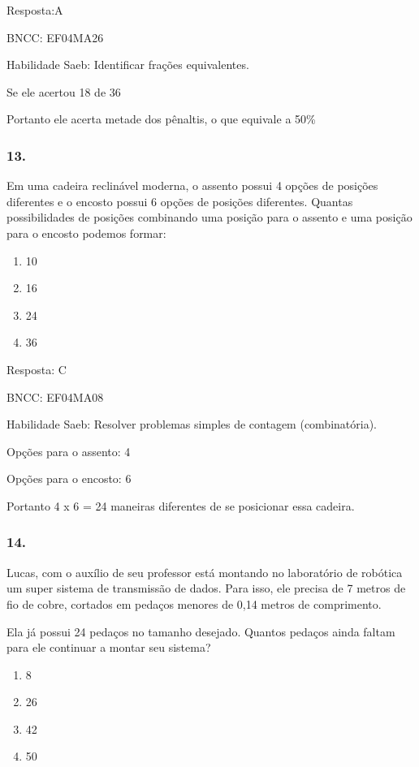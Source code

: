 Resposta:A

BNCC: EF04MA26

Habilidade Saeb: Identificar frações equivalentes.

Se ele acertou 18 de 36

Portanto ele acerta metade dos pênaltis, o que equivale a 50\%

\subsubsection{13.}\label{section-184}

Em uma cadeira reclinável moderna, o assento possui 4 opções de posições
diferentes e o encosto possui 6 opções de posições diferentes. Quantas
possibilidades de posições combinando uma posição para o assento e uma
posição para o encosto podemos formar:

\begin{enumerate}
\def\labelenumi{\alph{enumi})}
\item
  10
\item
  16
\item
  24
\item
  36
\end{enumerate}

Resposta: C

BNCC: EF04MA08

Habilidade Saeb: Resolver problemas simples de contagem (combinatória).

Opções para o assento: 4

Opções para o encosto: 6

Portanto 4 x 6 = 24 maneiras diferentes de se posicionar essa cadeira.

\subsubsection{14.}\label{section-185}

Lucas, com o auxílio de seu professor está montando no laboratório de
robótica um super sistema de transmissão de dados. Para isso, ele
precisa de 7 metros de fio de cobre, cortados em pedaços menores de 0,14
metros de comprimento.

Ela já possui 24 pedaços no tamanho desejado. Quantos pedaços ainda
faltam para ele continuar a montar seu sistema?

\begin{enumerate}
\def\labelenumi{\alph{enumi})}
\item
  8
\item
  26
\item
  42
\item
  50
\end{enumerate}

